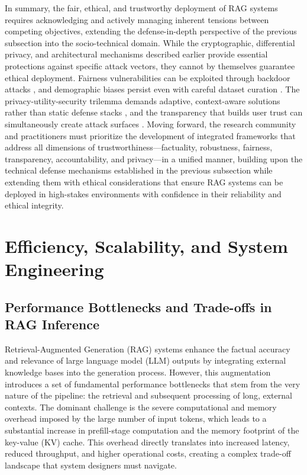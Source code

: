 \documentclass[11pt]{article}
\begin{document}
In summary, the fair, ethical, and trustworthy deployment of RAG systems requires acknowledging and actively managing inherent tensions between competing objectives, extending the defense-in-depth perspective of the previous subsection into the socio-technical domain. While the cryptographic, differential privacy, and architectural mechanisms described earlier provide essential protections against specific attack vectors, they cannot by themselves guarantee ethical deployment. Fairness vulnerabilities can be exploited through backdoor attacks \cite{ref499}, and demographic biases persist even with careful dataset curation \cite{ref72}. The privacy-utility-security trilemma demands adaptive, context-aware solutions rather than static defense stacks \cite{ref457}, and the transparency that builds user trust can simultaneously create attack surfaces \cite{ref504}. Moving forward, the research community and practitioners must prioritize the development of integrated frameworks that address all dimensions of trustworthiness---factuality, robustness, fairness, transparency, accountability, and privacy---in a unified manner, building upon the technical defense mechanisms established in the previous subsection while extending them with ethical considerations that ensure RAG systems can be deployed in high-stakes environments with confidence in their reliability and ethical integrity.

\section{Efficiency, Scalability, and System Engineering}

\subsection{Performance Bottlenecks and Trade-offs in RAG Inference}

Retrieval-Augmented Generation (RAG) systems enhance the factual accuracy and relevance of large language model (LLM) outputs by integrating external knowledge bases into the generation process. However, this augmentation introduces a set of fundamental performance bottlenecks that stem from the very nature of the pipeline: the retrieval and subsequent processing of long, external contexts. The dominant challenge is the severe computational and memory overhead imposed by the large number of input tokens, which leads to a substantial increase in prefill-stage computation and the memory footprint of the key-value (KV) cache. This overhead directly translates into increased latency, reduced throughput, and higher operational costs, creating a complex trade-off landscape that system designers must navigate.
\end{document}
